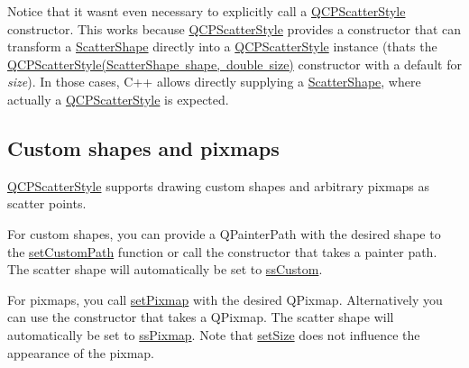 \begin{DoxyCodeInclude}{0}
\end{DoxyCodeInclude}
 Notice that it wasn\textquotesingle{}t even necessary to explicitly call a \mbox{\hyperlink{class_q_c_p_scatter_style}{Q\+C\+P\+Scatter\+Style}} constructor. This works because \mbox{\hyperlink{class_q_c_p_scatter_style}{Q\+C\+P\+Scatter\+Style}} provides a constructor that can transform a \mbox{\hyperlink{class_q_c_p_scatter_style_adb31525af6b680e6f1b7472e43859349}{Scatter\+Shape}} directly into a \mbox{\hyperlink{class_q_c_p_scatter_style}{Q\+C\+P\+Scatter\+Style}} instance (that\textquotesingle{}s the \mbox{\hyperlink{class_q_c_p_scatter_style_a003d92f74f4561eda111862eadd62f28}{Q\+C\+P\+Scatter\+Style(\+Scatter\+Shape shape, double size)}} constructor with a default for {\itshape size}). In those cases, C++ allows directly supplying a \mbox{\hyperlink{class_q_c_p_scatter_style_adb31525af6b680e6f1b7472e43859349}{Scatter\+Shape}}, where actually a \mbox{\hyperlink{class_q_c_p_scatter_style}{Q\+C\+P\+Scatter\+Style}} is expected.\hypertarget{class_q_c_p_scatter_style_QCPScatterStyle-custompath-and-pixmap}{}\subsection{Custom shapes and pixmaps}\label{class_q_c_p_scatter_style_QCPScatterStyle-custompath-and-pixmap}
\mbox{\hyperlink{class_q_c_p_scatter_style}{Q\+C\+P\+Scatter\+Style}} supports drawing custom shapes and arbitrary pixmaps as scatter points.

For custom shapes, you can provide a Q\+Painter\+Path with the desired shape to the \mbox{\hyperlink{class_q_c_p_scatter_style_a96a3e949f90b2afe5677ca9412a12a1e}{set\+Custom\+Path}} function or call the constructor that takes a painter path. The scatter shape will automatically be set to \mbox{\hyperlink{class_q_c_p_scatter_style_adb31525af6b680e6f1b7472e43859349a15d9bcfd9de94edda949006529f9219d}{ss\+Custom}}.

For pixmaps, you call \mbox{\hyperlink{class_q_c_p_scatter_style_a5fb611d46acfac520d7b89a1c71d9246}{set\+Pixmap}} with the desired Q\+Pixmap. Alternatively you can use the constructor that takes a Q\+Pixmap. The scatter shape will automatically be set to \mbox{\hyperlink{class_q_c_p_scatter_style_adb31525af6b680e6f1b7472e43859349a8718b849ca7c307b07b8e091efb0c31e}{ss\+Pixmap}}. Note that \mbox{\hyperlink{class_q_c_p_scatter_style_aaefdd031052892c4136129db68596e0f}{set\+Size}} does not influence the appearance of the pixmap. 


